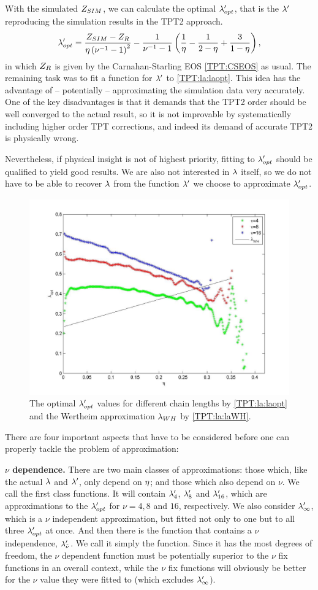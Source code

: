 \documentclass[8.5pt,twoside,twocolumn]{article}
\theoremstyle{standard}
\begin{document}
With the simulated $Z_{SIM}$, we can calculate the optimal $\lambda_{opt}'$, that is the
$\lambda'$ reproducing the simulation results in the TPT2 approach.
\begin{equation}
\lambda_{opt}'=\frac{Z_{SIM}-Z_{R}}{\eta\left({\nu^{-1}-1}\right)^2}-\frac1{\nu^{-1}-1}\left({\frac 1 {\eta} -\frac1{2-\eta}+\frac{3}{1-\eta}}\right),
\label{TPT:la:laopt}
\end{equation} 
in which $Z_{R}$ is given by the Carnahan-Starling EOS \eqref{TPT:CSEOS} as usual. The remaining
task was to fit a function for $\lambda'$ to \eqref{TPT:la:laopt}. This idea has the advantage
of -- potentially -- approximating the simulation data very accurately. One of the key disadvantages
is that it demands that the TPT2 order should be well converged to the actual result, so it
is not improvable by systematically including higher order TPT corrections, and indeed its demand
of accurate TPT2 is physically wrong.

Nevertheless, if physical insight is not of highest priority, fitting to $\lambda_{opt}'$ should
be qualified to yield good results. We are also not interested in $\lambda$ itself, so we
do not have to be able to recover $\lambda$ from the function $\lambda'$ we choose to approximate $\lambda_{opt}'$.

\begin{figure}[here]
\includegraphics[width=.5\textwidth]{Figures/LambdasInOnePic.jpg}
\caption{The optimal $\lambda_{opt}'$ values for different chain lengths by \eqref{TPT:la:laopt}
and the Wertheim approximation $\lambda_{WH}$ by \eqref{TPT:la:laWH}.}
\label{figure:LambdasInOnePic}
\end{figure}


There are four important aspects that have to be considered before one can properly
tackle the problem of approximation:

\textbf{$\nu$ dependence.} There are two main classes of approximations:
those which, like the actual $\lambda$ and $\lambda'$, only depend on $\eta$; and those which also depend
on $\nu$. We call the first class  functions. It will contain $\lambda'_{4}$, $\lambda'_{8}$ and $\lambda'_{16}$, which
are approximations to the $\lambda_{opt}'$ for $\nu=4,8$ and $16$, respectively. We also consider
$\lambda'_{\infty}$, which is a $\nu$ independent approximation, but fitted not only to one
but to all three $\lambda_{opt}'$ at once. And then there is the function that contains a
$\nu$ independence, $\lambda'_{\tilde \nu}$. We call it simply the  function. Since
it has the most degrees of freedom, the $\nu$ dependent function must be potentially
superior to the $\nu$ fix functions in an overall context, while the $\nu$ fix functions
will obviously be better for the $\nu$ value they were fitted to (which excludes $\lambda'_{\infty}$).
\end{document}
